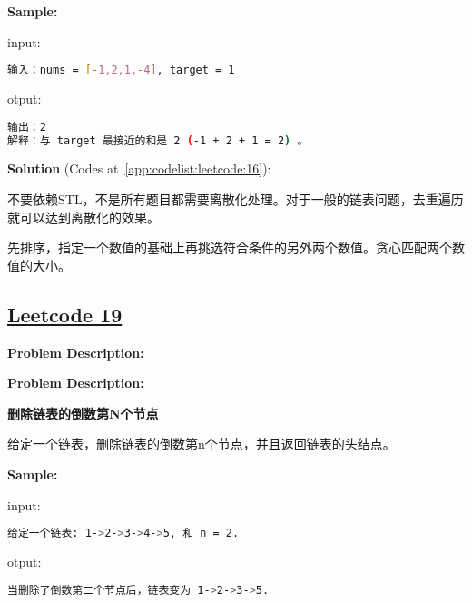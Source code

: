 \textbf{Sample:}\par

input:\par

\begin{lstlisting}[language=bash]
输入：nums = [-1,2,1,-4], target = 1
\end{lstlisting}

otput:\par

\begin{lstlisting}[language=bash]
输出：2
解释：与 target 最接近的和是 2 (-1 + 2 + 1 = 2) 。
\end{lstlisting}

\textbf{Solution }(Codes at~\ref{app:codelist:leetcode:16}):\par

不要依赖STL，不是所有题目都需要离散化处理。对于一般的链表问题，去重遍历就可以达到离散化的效果。\par

先排序，指定一个数值的基础上再挑选符合条件的另外两个数值。贪心匹配两个数值的大小。\par



\subsection{\href{https://leetcode-cn.com/}{Leetcode 19}}\label{app:problemlist:leetcode:19}

\textbf{Problem Description:}\par

\textbf{Problem Description:}\par

\textbf{删除链表的倒数第N个节点}\par

给定一个链表，删除链表的倒数第n个节点，并且返回链表的头结点。\par


\textbf{Sample:}\par

input:\par

\begin{lstlisting}[language=bash]
给定一个链表: 1->2->3->4->5, 和 n = 2.
\end{lstlisting}

otput:\par

\begin{lstlisting}[language=bash]
当删除了倒数第二个节点后，链表变为 1->2->3->5.
\end{lstlisting}

